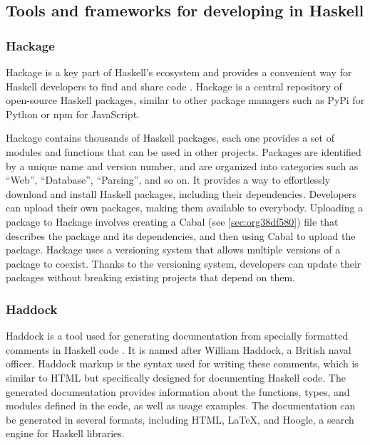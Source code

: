 \documentclass[a4paper, titlepage, twoside]{article}
\begin{document}
\subsection{Tools and frameworks for developing in Haskell}
\label{sec:org071518a}

\subsubsection{Hackage}
\label{sec:orgef1fc3f}

Hackage is a key part of Haskell's ecosystem and provides a convenient way for Haskell developers to find and share code \autocite{hackageHackage2023}. Hackage is a central repository of open-source Haskell packages, similar to other package managers such as PyPi for Python or npm for JavaScript.

Hackage contains thousands of Haskell packages, each one provides a set of modules and functions that can be used in other projects. Packages are identified by a unique name and version number, and are organized into categories such as ``Web'', ``Database'', ``Parsing'', and so on. It provides a way to effortlessly download and install Haskell packages, including their dependencies. Developers can upload their own packages, making them available to everybody. Uploading a package to Hackage involves creating a Cabal (see \ref{sec:org38df580}) file that describes the package and its dependencies, and then using Cabal to upload the package. Hackage uses a versioning system that allows multiple versions of a package to coexist. Thanks to the versioning system, developers can update their packages without breaking existing projects that depend on them.

\subsubsection{Haddock}
\label{sec:org9c9e596}

Haddock is a tool used for generating documentation from specially formatted comments in Haskell code \autocite{haddockHaddockDocumentation2023}. It is named after William Haddock, a British naval officer. Haddock markup is the syntax used for writing these comments, which is similar to HTML but specifically designed for documenting Haskell code. The generated documentation provides information about the functions, types, and modules defined in the code, as well as usage examples. The documentation can be generated in several formats, including HTML, \LaTeX{}, and Hoogle, a search engine for Haskell libraries.
\end{document}
